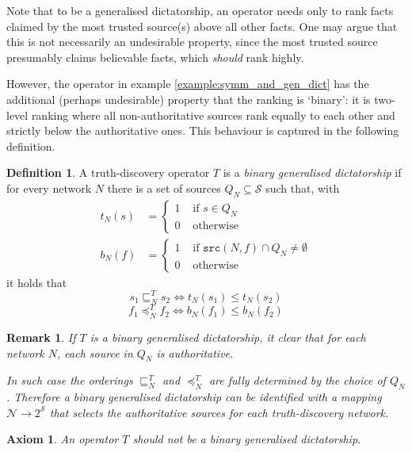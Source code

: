 \documentclass{article}
\theoremstyle{definition} \newtheorem{definition}{Definition}
\theoremstyle{definition} \newtheorem{example}{Example}
\theoremstyle{plain} \newtheorem{axiom}{Axiom}
\theoremstyle{plain} \newtheorem*{remark}{Remark}
\theoremstyle{remark} \newtheorem*{notation}{Notation}
\theoremstyle{plain} \newtheorem{lemma}{Lemma}
\theoremstyle{plain} \newtheorem{theorem}{Theorem}
\theoremstyle{plain} \newtheorem{proposition}{Proposition}
\renewcommand{\S}{\mathcal{S}}  %
\newcommand{\N}{\mathcal{N}}
\newcommand{\sle}{\sqsubseteq}
\newcommand{\fle}{\preceq}
\newcommand{\src}{\texttt{src}}
\begin{document}
Note that to be a generalised dictatorship, an operator needs only to rank
facts claimed by the most trusted source(s) above all other facts. One may
argue that this is not necessarily an undesirable property, since the most
trusted source presumably claims believable facts, which \emph{should} rank
highly.

However, the operator in example \ref{example:symm_and_gen_dict} has the
additional (perhaps undesirable) property that the ranking is `binary': it is
two-level ranking where all non-authoritative sources rank equally to each
other and strictly below the authoritative ones. This behaviour is captured in
the following definition.

\begin{definition}
A truth-discovery operator $T$ is a \emph{binary generalised dictatorship} if
for every network $N$ there is a set of sources $Q_N \subseteq \S$ such that,
with
\begin{align*}
    t_N(s) & = \begin{cases}
        1 & \text{ if } s \in Q_N \\
        0 & \text{ otherwise}
    \end{cases} \\
    b_N(f) & = \begin{cases}
        1 & \text{ if } \src(N, f) \cap Q_N \ne \emptyset \\
        0 & \text{ otherwise}
    \end{cases}
\end{align*}
it holds that
\[ s_1 \sle_N^T s_2 \iff t_N(s_1) \le t_N(s_2) \]
\[ f_1 \fle_N^T f_2 \iff b_N(f_1) \le b_N(f_2) \]

\end{definition}

\begin{remark}
If $T$ is a binary generalised dictatorship, it clear that for each network
$N$, each source in $Q_N$ is authoritative.

In such case the orderings $\sle_N^T$ and $\fle_N^T$ are fully determined by
the choice of $Q_N$. Therefore a binary generalised dictatorship can be
identified with a mapping $\N \rightarrow 2^\S$ that selects the authoritative
sources for each truth-discovery network.
\end{remark}

\begin{axiom}
\label{axiom:non_bin_gen_dict}
An operator $T$ should not be a binary generalised dictatorship.
\end{axiom}
\end{document}
